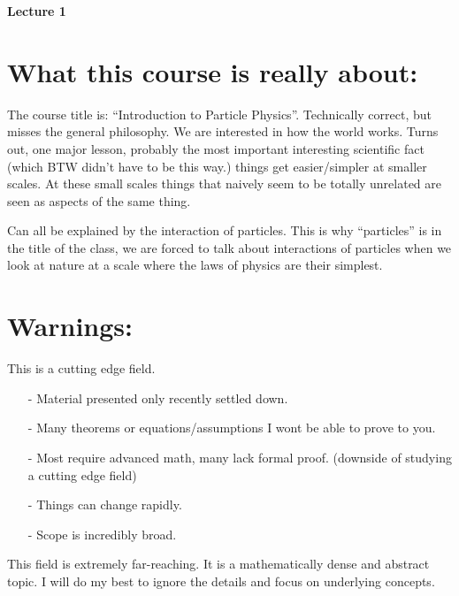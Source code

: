 



\thispagestyle{fancy}

\begin{center}
{\huge \textbf{Lecture 1}}
\end{center}

{\fontsize{14}{16}\selectfont

\section{What this course is really about:}
The course title is: ``Introduction to Particle Physics''.
Technically correct, but misses the general philosophy. 
We are interested in how the world works. 
Turns out, one major lesson, probably the most important interesting scientific fact (which BTW didn't have to be this way.) things get easier/simpler at smaller scales. 
At these small scales things that naively seem to be totally unrelated are seen as aspects of the same thing. 

Can all be explained by the interaction of particles. 
This is why ``particles'' is in the title of the class, we are forced to talk about interactions of particles when we look at nature at a scale where the laws of physics are their simplest. 

\section{Warnings:}
This is a cutting edge field. 
\begin{itemize}
\item[-] Material presented only recently settled down. 
\item[-] Many theorems or equations/assumptions I wont be able to prove to you. 
\item[-] Most require advanced math, many lack formal proof.  (downside of studying a cutting edge field)
\item[-] Things can change rapidly. 
\item[-] Scope is incredibly broad. 
\end{itemize}

This field is extremely far-reaching. 
It is a mathematically dense and abstract topic. 
I will do my best to ignore the details and focus on underlying concepts.

}
